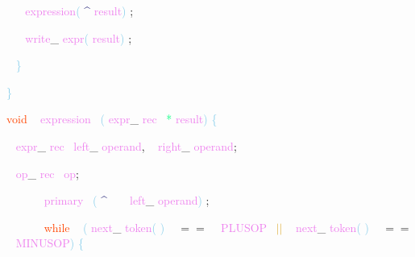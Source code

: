 \documentclass[8, usernames, dvipsnames]{beamer}
\begin{document}
\begin{frame}
\textcolor{White}{\   }
\textcolor{White}{\   }
\textcolor{Violet}{expression}\textcolor{SkyBlue}{(}
\textcolor{MidnightBlue}{\textasciicircum}
\textcolor{Violet}{result}\textcolor{SkyBlue}{)}
\textcolor{Sepia}{;}

 \textcolor{White}{\   }
\textcolor{White}{\   }
\textcolor{Violet}{write}\textcolor{Sepia}{\_}
\textcolor{Violet}{expr}\textcolor{SkyBlue}{(}
\textcolor{Violet}{result}\textcolor{SkyBlue}{)}
\textcolor{Sepia}{;}

 \textcolor{White}{\   }
\textcolor{SkyBlue}{\} }

 \textcolor{SkyBlue}{\} }

 
 \textcolor{OrangeRed}{void}
\textcolor{White}{\ }
\textcolor{Violet}{expression}\textcolor{White}{\ }
\textcolor{SkyBlue}{(}
\textcolor{Violet}{expr}\textcolor{Sepia}{\_}
\textcolor{Violet}{rec}\textcolor{White}{\ }
\textcolor{SpringGreen}{*}
\textcolor{Violet}{result}\textcolor{SkyBlue}{)}
\textcolor{SkyBlue}{\{ }

 \textcolor{White}{\   }
\textcolor{Violet}{expr}\textcolor{Sepia}{\_}
\textcolor{Violet}{rec}\textcolor{White}{\ }
\textcolor{Violet}{left}\textcolor{Sepia}{\_}
\textcolor{Violet}{operand}\textcolor{Sepia}{,}
\textcolor{White}{\ }
\textcolor{Violet}{right}\textcolor{Sepia}{\_}
\textcolor{Violet}{operand}\textcolor{Sepia}{;}

 \textcolor{White}{\   }
\textcolor{Violet}{op}\textcolor{Sepia}{\_}
\textcolor{Violet}{rec}\textcolor{White}{\ }
\textcolor{Violet}{op}\textcolor{Sepia}{;}

 \textcolor{White}{\ }
\textcolor{White}{\ }
\textcolor{White}{\ }
\textcolor{White}{\ }
\textcolor{Violet}{primary}\textcolor{White}{\ }
\textcolor{SkyBlue}{(}
\textcolor{MidnightBlue}{\textasciicircum}
\textcolor{White}{\ }
\textcolor{White}{\ }
\textcolor{Violet}{left}\textcolor{Sepia}{\_}
\textcolor{Violet}{operand}\textcolor{SkyBlue}{)}
\textcolor{Sepia}{;}

 \textcolor{White}{\ }
\textcolor{White}{\ }
\textcolor{White}{\ }
\textcolor{White}{\   }
\textcolor{OrangeRed}{while}
\textcolor{White}{\ }
\textcolor{SkyBlue}{(}
\textcolor{Violet}{next}\textcolor{Sepia}{\_}
\textcolor{Violet}{token}\textcolor{SkyBlue}{(}
\textcolor{SkyBlue}{)}
\textcolor{White}{\ }
\textcolor{OliveGreen}{$==$}
\textcolor{White}{\ }
\textcolor{Violet}{PLUSOP}\textcolor{White}{\ }
\textcolor{Goldenrod}{ $||$ }
\textcolor{White}{\ }
\textcolor{Violet}{next}\textcolor{Sepia}{\_}
\textcolor{Violet}{token}\textcolor{SkyBlue}{(}
\textcolor{SkyBlue}{)}
\textcolor{White}{\ }
\textcolor{OliveGreen}{$==$}
\textcolor{White}{\ }
\textcolor{Violet}{MINUSOP}\textcolor{SkyBlue}{)}
\textcolor{SkyBlue}{\{ }

 \end{frame}
\end{document}
